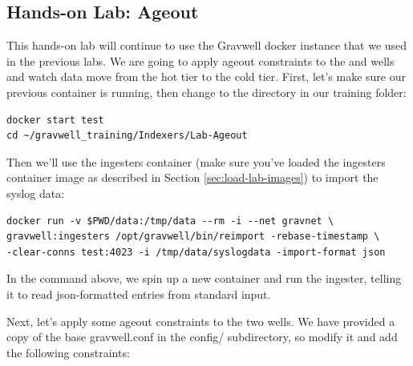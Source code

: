 {{\clearpage
\subsection{Hands-on Lab: Ageout}

This hands-on lab will continue to use the Gravwell docker instance
that we used in the previous labs. We are going to apply ageout
constraints to the  and  wells and watch data move
from the hot tier to the cold tier. First, let's make sure our previous
container is running, then change to the  directory in
our training folder:

\begin{Verbatim}[breaklines=true]
docker start test
cd ~/gravwell_training/Indexers/Lab-Ageout
\end{Verbatim}

Then we'll use the ingesters container (make sure you've loaded the ingesters container image as described in Section \ref{sec:load-lab-images}) to import the syslog data:
\begin{Verbatim}[breaklines=true]
docker run -v $PWD/data:/tmp/data --rm -i --net gravnet \
gravwell:ingesters /opt/gravwell/bin/reimport -rebase-timestamp \
-clear-conns test:4023 -i /tmp/data/syslogdata -import-format json
\end{Verbatim}


In the command above, we spin up a new container and run the  ingester, telling it to read json-formatted entries from standard input.

Next, let's apply some ageout constraints to the two wells. We have provided a copy of the
base gravwell.conf in the config/ subdirectory, so modify it and add the following constraints:

}}
